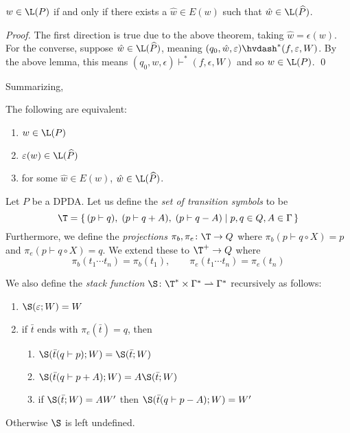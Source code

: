 \documentclass{llncs}
\begin{document}
\begin{theorem}

    $w\in\L(P)$ if and only if there exists a $\hat w\in E(w)$ such that $\hat w\in\L(\widehat P)$.

\end{theorem}

\begin{proof}

    The first direction is true due to the above theorem, taking $\hat w=\epsilon(w)$.
    For the converse, suppose $\hat w\in\L(\widehat P)$, meaning $(q_0,\hat w,\epsilon)\hvdash^*(f,\epsilon,W)$.
    By the above lemma, this means $(q_0,w,\epsilon)\vdash^*(f,\epsilon,W)$ and so $w\in\L(P)$.
    \qed

\end{proof}

Summarizing,

\begin{corollary}

    The following are equivalent:
    \begin{enumerate}
        \item $w\in\L(P)$
        \item $\epsilon(w)\in\L(\widehat P)$
        \item for some $\hat w\in E(w)$, $\hat w\in\L(\widehat P)$.
    \end{enumerate}

\end{corollary}



Let $P$ be a DPDA.
Let us define the \emph{set of transition symbols} to be
$$ \T = \set{(p\vdash q),\;(p\vdash q+A),\;(p\vdash q-A)}[p,q\in Q,A\in\Gamma] $$
Furthermore, we define the \emph{projections} $\pi_b,\pi_e\colon\T\to Q$ where $\pi_b(p\vdash q\circ X)=p$ and $\pi_e(p\vdash q\circ X)=q$.
We extend these to $\T^+\to Q$ where
$$ \pi_b(t_1\cdots t_n) = \pi_b(t_1),\qquad \pi_e(t_1\cdots t_n) = \pi_e(t_n) $$

We also define the \emph{stack function} $\S\colon\T^*\times\Gamma^*\partial\Gamma^*$ recursively as follows:
\begin{enumerate}
    \item $\S(\epsilon;W)=W$
    \item if $\bar t$ ends with $\pi_e(\bar t)=q$, then
    \begin{enumerate}
        \item $\S(\bar t(q\vdash p);W)=\S(\bar t;W)$
        \item $\S(\bar t(q\vdash p+A);W)=A\S(\bar t;W)$
        \item if $\S(\bar t;W)=AW'$ then $\S(\bar t(q\vdash p-A);W)=W'$
    \end{enumerate}
\end{enumerate}
Otherwise $\S$ is left undefined.
\end{document}
